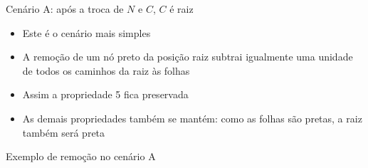 \begin{frame}[fragile]{Cenário A: após a troca de $N$ e $C$, $C$ é raiz}

    \begin{itemize}
        \item Este é o cenário mais simples

        \item A remoção de um nó preto da posição raiz subtrai igualmente uma unidade de todos
            os caminhos da raiz às folhas

        \item Assim a propriedade 5 fica preservada

        \item As demais propriedades também se mantém: como as folhas são pretas, a raiz também
            será preta
    \end{itemize}

\end{frame}

\begin{frame}[fragile]{Exemplo de remoção no cenário A}


\end{frame}

